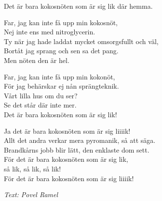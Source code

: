 Det är bara kokosnöten som är sig lik där hemma.\par
\vspace{10pt}
Far, jag kan inte få upp min kokosnöt,\\
Nej inte ens med nitroglycerin.\\
Ty när jag hade laddat mycket omsorgsfullt och väl,\\
Bortåt jag sprang och sen sa det pang.\\
Men nöten den är hel.\par
\vspace{10pt}
Far, jag kan inte få upp min kokonöt,\\
För jag behärskar ej nån sprängteknik.\\
Vårt lilla hus om du ser?\\
Se det står där inte mer.\\
Det är bara kokosnöten som är sig lik!\par
\vspace{10pt}
Ja det är bara kokosnöten som är sig liiiik!\\
Allt det andra verkar mera pyromanik, så att säga.\\
Brandkårns jobb blir lätt, den enklaste dom sett.\\
För det är bara kokosnöten som är sig lik,\\
så lik, så lik, så lik!\\
För det är bara kokosnöten som är sig liiiik!\par
\vspace{10pt}
{\footnotesize\textit{Text: Povel Ramel}}
